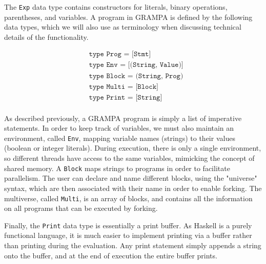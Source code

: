 \documentclass[preprint]{sigplanconf}
\begin{document}
The \texttt{Exp} data type contains constructors for literals, binary operations, parentheses, and variables. A program in GRAMPA is defined by the following data types, which we will also use as terminology when discussing technical details of the functionality.

\begin{align*}
	&\texttt{type Prog = [Stmt]} \\
	&\texttt{type Env = [(String, Value)]} \\
	&\texttt{type Block = (String, Prog)} \\
	&\texttt{type Multi = [Block]} \\
	&\texttt{type Print = [String]} \\
\end{align*}

As described previously, a GRAMPA program is simply a list of imperative statements. In order to keep track of variables, we must also maintain an environment, called \texttt{Env}, mapping variable names (strings) to their values (boolean or integer literals). During execution, there is only a single environment, so different threads have access to the same variables, mimicking the concept of shared memory. A \texttt{Block} maps strings to programs in order to facilitate parallelism. The user can declare and name different blocks, using the "universe" syntax, which are then associated with their name in order to enable forking. The multiverse, called \texttt{Multi}, is an array of blocks, and contains all the information on all programs that can be executed by forking. 

Finally, the \texttt{Print} data type is essentially a print buffer. As Haskell is a purely functional language, it is much easier to implement printing via a buffer rather than printing during the evaluation. Any print statement simply appends a string onto the buffer, and at the end of execution the entire buffer prints.
\end{document}
